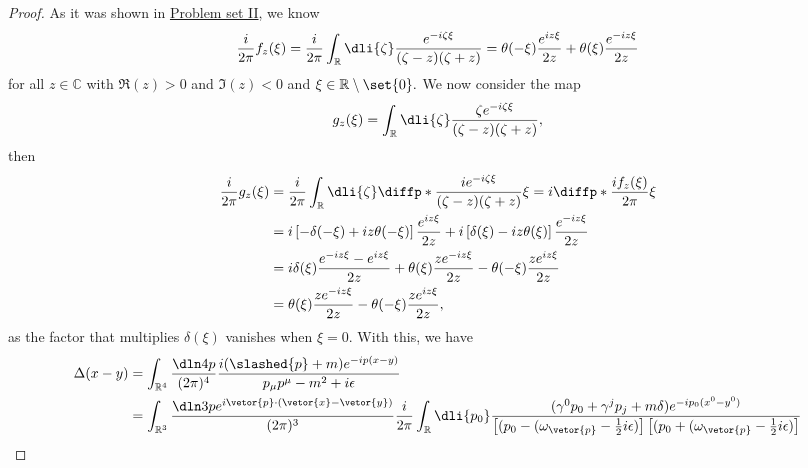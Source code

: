 \begin{proof}
   As it was shown in \href{https://github.com/louisradial/4305107-quantum-field-theory-i/releases/tag/pset2}{Problem set II}, we know 
   \begin{equation*}
      \frac{i}{2\pi} f_z(\xi) = \frac{i}{2\pi}\int_{\mathbb{R}} \dli{\zeta} \frac{e^{-i \zeta \xi}}{(\zeta - z)(\zeta + z)} = \theta(-\xi) \frac{e^{iz\xi}}{2z} + \theta(\xi) \frac{e^{-iz\xi}}{2z}
   \end{equation*}
   for all \(z \in \mathbb{C}\) with \(\Re(z) > 0\) and \(\Im(z) < 0\) and \(\xi \in \mathbb{R} \setminus \set{0}.\) We now consider the map
   \begin{equation*}
      g_z(\xi) = \int_{\mathbb{R}} \dli{\zeta} \frac{\zeta e^{-i\zeta \xi}}{(\zeta - z)(\zeta + z)},
   \end{equation*}
   then
   \begin{align*}
      \frac{i}{2\pi} g_z(\xi) &= \frac{i}{2\pi}\int_{\mathbb{R}} \dli{\zeta} \diffp*{\frac{ie^{-i\zeta \xi}}{(\zeta - z) (\zeta + z)}}{\xi} = i\diffp*{\frac{if_z(\xi)}{2\pi}}{\xi}\\
                              &= i \left[-\delta(-\xi) + iz\theta(-\xi)\right]\frac{e^{iz \xi}}{2z}+ i \left[\delta(\xi) - iz \theta(\xi)\right]\frac{e^{-iz \xi}}{2z}\\
                              &= i \delta(\xi) \frac{e^{-iz \xi} - e^{iz\xi}}{2z} + \theta(\xi) \frac{ze^{-iz \xi}}{2z} - \theta(-\xi) \frac{z e^{iz \xi}}{2z}\\
                              &= \theta(\xi) \frac{ze^{-iz \xi}}{2z} - \theta(-\xi) \frac{z e^{iz \xi}}{2z},
   \end{align*}
   as the factor that multiplies \(\delta(\xi)\) vanishes when \(\xi = 0\). With this, we have
   \begin{align*}
      \Delta(x - y) &= \int_{\mathbb{R}^4} \frac{\dln4p}{(2\pi)^4} \frac{i(\slashed{p} + m) e^{-ip(x - y)}}{p_\mu p^\mu - m^2 + i \epsilon}\\
                                  &= \int_{\mathbb{R}^3} \frac{\dln3p e^{i \vetor{p}\cdot (\vetor{x} - \vetor{y})}}{(2\pi)^3} \frac{i}{2\pi} \int_{\mathbb{R}} \dli{p_0} \frac{(\gamma^0 p_0  + \gamma^j p_j + m \delta) e^{-ip_0(x^0 -y^0)}}{\left[(p_0 - (\omega_{\vetor{p}} - \frac12 i \epsilon)\right]\left[(p_0 + (\omega_{\vetor{p}} - \frac12 i \epsilon)\right]}\\

\end{align*}
\end{proof}
